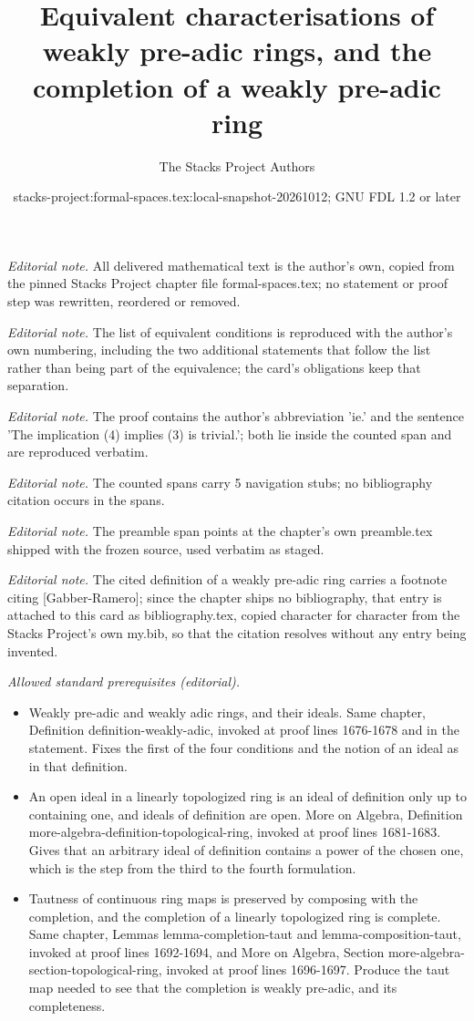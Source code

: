 \documentclass{stacks-project}
\title{Equivalent characterisations of weakly pre-adic rings, and the completion of a weakly pre-adic ring}
\author{The Stacks Project Authors}
\date{stacks-project:formal-spaces.tex:local-snapshot-20261012; GNU FDL 1.2 or later}
\theoremstyle{plain}
\theoremstyle{definition}
\theoremstyle{remark}
\numberwithin{equation}{subsection}
\begin{document}
\maketitle
\noindent\textit{Editorial note.} All delivered mathematical text is the author's own, copied from the pinned Stacks Project chapter file formal-spaces.tex; no statement or proof step was rewritten, reordered or removed.\par\medskip
\noindent\textit{Editorial note.} The list of equivalent conditions is reproduced with the author's own numbering, including the two additional statements that follow the list rather than being part of the equivalence; the card's obligations keep that separation.\par\medskip
\noindent\textit{Editorial note.} The proof contains the author's abbreviation 'ie.' and the sentence 'The implication (4) implies (3) is trivial.'; both lie inside the counted span and are reproduced verbatim.\par\medskip
\noindent\textit{Editorial note.} The counted spans carry 5 navigation stubs; no bibliography citation occurs in the spans.\par\medskip
\noindent\textit{Editorial note.} The preamble span points at the chapter's own preamble.tex shipped with the frozen source, used verbatim as staged.\par\medskip
\noindent\textit{Editorial note.} The cited definition of a weakly pre-adic ring carries a footnote citing [Gabber-Ramero]; since the chapter ships no bibliography, that entry is attached to this card as bibliography.tex, copied character for character from the Stacks Project's own my.bib, so that the citation resolves without any entry being invented.\par\medskip
\noindent\textit{Allowed standard prerequisites (editorial).}\begin{itemize}
\item Weakly pre-adic and weakly adic rings, and their ideals. Same chapter, Definition definition-weakly-adic, invoked at proof lines 1676-1678 and in the statement. Fixes the first of the four conditions and the notion of an ideal as in that definition.
\item An open ideal in a linearly topologized ring is an ideal of definition only up to containing one, and ideals of definition are open. More on Algebra, Definition more-algebra-definition-topological-ring, invoked at proof lines 1681-1683. Gives that an arbitrary ideal of definition contains a power of the chosen one, which is the step from the third to the fourth formulation.
\item Tautness of continuous ring maps is preserved by composing with the completion, and the completion of a linearly topologized ring is complete. Same chapter, Lemmas lemma-completion-taut and lemma-composition-taut, invoked at proof lines 1692-1694, and More on Algebra, Section more-algebra-section-topological-ring, invoked at proof lines 1696-1697. Produce the taut map needed to see that the completion is weakly pre-adic, and its completeness.
\end{itemize}\medskip
\end{document}
